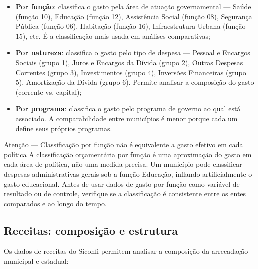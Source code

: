 \begin{itemize}
  \item \textbf{Por função}: classifica o gasto pela área de atuação governamental --- Saúde (função 10), Educação (função 12), Assistência Social (função 08), Segurança Pública (função 06), Habitação (função 16), Infraestrutura Urbana (função 15), etc. É a classificação mais usada em análises comparativas;

  \item \textbf{Por natureza}: classifica o gasto pelo tipo de despesa --- Pessoal e Encargos Sociais (grupo 1), Juros e Encargos da Dívida (grupo 2), Outras Despesas Correntes (grupo 3), Investimentos (grupo 4), Inversões Financeiras (grupo 5), Amortização da Dívida (grupo 6). Permite analisar a composição do gasto (corrente vs. capital);

  \item \textbf{Por programa}: classifica o gasto pelo programa de governo ao qual está associado. A comparabilidade entre municípios é menor porque cada um define seus próprios programas.
\end{itemize}

\begin{boxatencao}{Atenção --- Classificação por função não é equivalente a gasto efetivo em cada política}
A classificação orçamentária por função é uma aproximação do gasto em cada área de política, não uma medida precisa. Um município pode classificar despesas administrativas gerais sob a função Educação, inflando artificialmente o gasto educacional. Antes de usar dados de gasto por função como variável de resultado ou de controle, verifique se a classificação é consistente entre os entes comparados e ao longo do tempo.
\end{boxatencao}

\subsection{Receitas: composição e estrutura}

Os dados de receitas do Siconfi permitem analisar a composição da arrecadação municipal e estadual:

